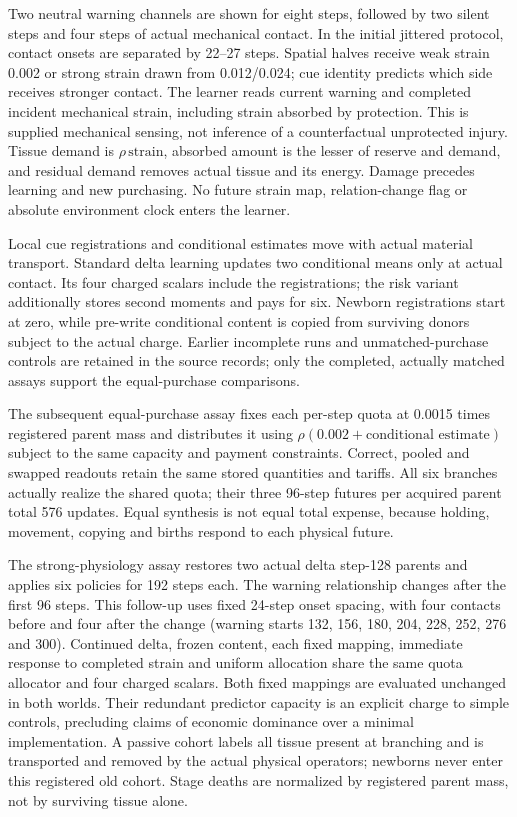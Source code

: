 Two neutral warning channels are shown for eight steps, followed by two silent steps and four steps of actual mechanical contact. In the initial jittered protocol, contact onsets are separated by 22--27 steps. Spatial halves receive weak strain 0.002 or strong strain drawn from 0.012/0.024; cue identity predicts which side receives stronger contact. The learner reads current warning and completed incident mechanical strain, including strain absorbed by protection. This is supplied mechanical sensing, not inference of a counterfactual unprotected injury. Tissue demand is $\rho\,\mathrm{strain}$, absorbed amount is the lesser of reserve and demand, and residual demand removes actual tissue and its energy. Damage precedes learning and new purchasing. No future strain map, relation-change flag or absolute environment clock enters the learner.

Local cue registrations and conditional estimates move with actual material transport. Standard delta learning updates two conditional means only at actual contact. Its four charged scalars include the registrations; the risk variant additionally stores second moments and pays for six. Newborn registrations start at zero, while pre-write conditional content is copied from surviving donors subject to the actual charge. Earlier incomplete runs and unmatched-purchase controls are retained in the source records; only the completed, actually matched assays support the equal-purchase comparisons.

The subsequent equal-purchase assay fixes each per-step quota at 0.0015 times registered parent mass and distributes it using $\rho(0.002+\text{conditional estimate})$ subject to the same capacity and payment constraints. Correct, pooled and swapped readouts retain the same stored quantities and tariffs. All six branches actually realize the shared quota; their three 96-step futures per acquired parent total 576 updates. Equal synthesis is not equal total expense, because holding, movement, copying and births respond to each physical future.

The strong-physiology assay restores two actual delta step-128 parents and applies six policies for 192 steps each. The warning relationship changes after the first 96 steps. This follow-up uses fixed 24-step onset spacing, with four contacts before and four after the change (warning starts 132, 156, 180, 204, 228, 252, 276 and 300). Continued delta, frozen content, each fixed mapping, immediate response to completed strain and uniform allocation share the same quota allocator and four charged scalars. Both fixed mappings are evaluated unchanged in both worlds. Their redundant predictor capacity is an explicit charge to simple controls, precluding claims of economic dominance over a minimal implementation. A passive cohort labels all tissue present at branching and is transported and removed by the actual physical operators; newborns never enter this registered old cohort. Stage deaths are normalized by registered parent mass, not by surviving tissue alone.

